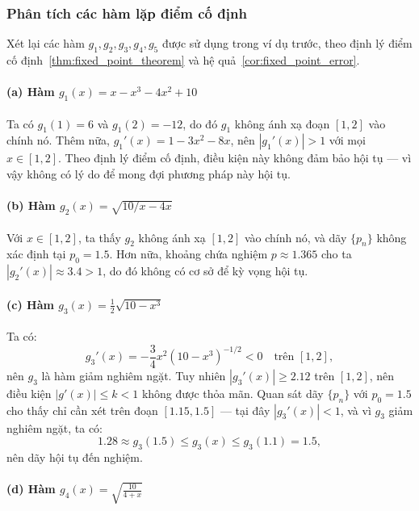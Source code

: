 \subsubsection*{Phân tích các hàm lặp điểm cố định}

Xét lại các hàm $g_1, g_2, g_3, g_4, g_5$ được sử dụng trong ví dụ trước, theo định lý điểm cố định~\ref{thm:fixed_point_theorem} và hệ quả~\ref{cor:fixed_point_error}.

\paragraph*{(a) Hàm $g_1(x) = x - x^3 - 4x^2 + 10$}

Ta có $g_1(1) = 6$ và $g_1(2) = -12$, do đó $g_1$ không ánh xạ đoạn $[1,2]$ vào chính nó.  
Thêm nữa, $g_1'(x) = 1 - 3x^2 - 8x$, nên $|g_1'(x)| > 1$ với mọi $x \in [1,2]$.  
Theo định lý điểm cố định, điều kiện này không đảm bảo hội tụ — vì vậy không có lý do để mong đợi phương pháp này hội tụ.

\paragraph*{(b) Hàm $g_2(x) = \sqrt{10/x - 4x}$}

Với $x \in [1,2]$, ta thấy $g_2$ không ánh xạ $[1,2]$ vào chính nó, và dãy $\{p_n\}$ không xác định tại $p_0 = 1.5$.  
Hơn nữa, khoảng chứa nghiệm $p \approx 1.365$ cho ta $|g_2'(x)| \approx 3.4 > 1$, do đó không có cơ sở để kỳ vọng hội tụ.

\paragraph*{(c) Hàm $g_3(x) = \tfrac{1}{2}\sqrt{10 - x^3}$}

Ta có:
\[
g_3'(x) = -\frac{3}{4}x^2 (10 - x^3)^{-1/2} < 0 \quad \text{trên } [1,2],
\]
nên $g_3$ là hàm giảm nghiêm ngặt.  
Tuy nhiên $|g_3'(x)| \ge 2.12$ trên $[1,2]$, nên điều kiện $|g'(x)| \le k < 1$ không được thỏa mãn.  
Quan sát dãy $\{p_n\}$ với $p_0 = 1.5$ cho thấy chỉ cần xét trên đoạn $[1.15, 1.5]$ — tại đây $|g_3'(x)| < 1$, và vì $g_3$ giảm nghiêm ngặt, ta có:
\[
1.28 \approx g_3(1.5) \le g_3(x) \le g_3(1.1) = 1.5,
\]
nên dãy hội tụ đến nghiệm.

\paragraph*{(d) Hàm $g_4(x) = \sqrt{\tfrac{10}{4+x}}$}

